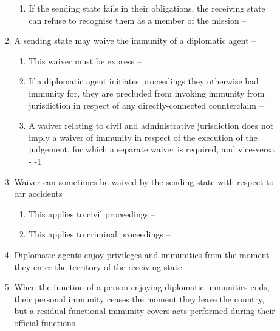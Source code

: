 \begin{enumerate}
\begin{enumerate}
\begin{enumerate}
\begin{enumerate}
                \item If the sending state fails in their obligations, the receiving state can refuse to recognise them as a member of the mission -- 
            \end{enumerate}
            \item A sending state may waive the immunity of a diplomatic agent -- 
            \begin{enumerate}
                \item This waiver must be express -- 
                \item If a diplomatic agent initiates proceedings they otherwise had immunity for, they are precluded from invoking immunity from jurisdiction in respect of any directly-connected counterclaim -- 
                \item A waiver relating to civil and administrative jurisdiction does not imply a waiver of immunity in respect of the execution of the judgement, for which a separate waiver is required, and vice-versa - -1
            \end{enumerate}
            \item Waiver can sometimes be waived by the sending state with respect to car accidents
            \begin{enumerate}
                \item This applies to civil proceedings -- 
                \item This applies to criminal proceedings -- 
            \end{enumerate}
            \item Diplomatic agents enjoy privileges and immunities from the moment they enter the territory of the receiving state -- 
            \item When the function of a person enjoying diplomatic immunities ends, their personal immunity ceases the moment they leave the country, but a residual functional immunity covers acts performed during their official functions -- 
        \end{enumerate}
    \end{enumerate}
\end{enumerate}

